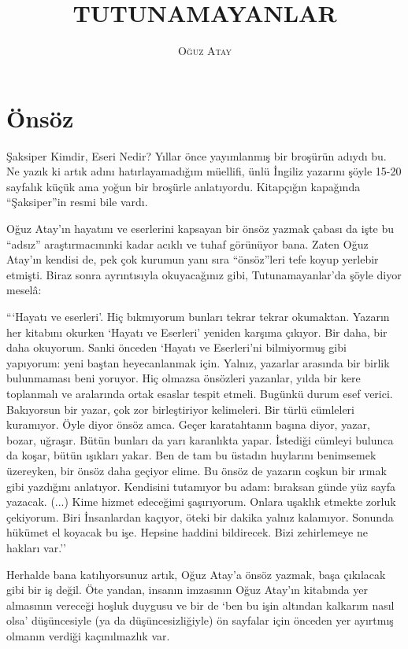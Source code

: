 \documentclass[a5paper,13pt]{scrbook}
\author{\textsc{Oğuz Atay}}
\title{TUTUNAMAYANLAR}
\date{}
\begin{document}
\maketitle

\chapter*{Önsöz}

Şaksiper Kimdir, Eseri Nedir? Yıllar önce yayımlanmış bir broşürün adıydı bu. Ne
yazık ki artık adını hatırlayamadığım müellifi, ünlü İngiliz yazarını şöyle
15-20 sayfalık küçük ama yoğun bir broşürle anlatıyordu. Kitapçığın kapağında
``Şaksiper''in resmi bile vardı.

Oğuz Atay'ın hayatını ve eserlerini kapsayan bir önsöz yazmak çabası da işte bu
``adsız'' araştırmacınınki kadar acıklı ve tuhaf görünüyor bana. Zaten Oğuz
Atay'ın kendisi de, pek çok kurumun yanı sıra ``önsöz''leri tefe koyup yerlebir
etmişti. Biraz sonra ayrıntısıyla okuyacağınız gibi, Tutunamayanlar'da şöyle
diyor meselâ:

```Hayatı ve eserleri'. Hiç bıkmıyorum bunları tekrar tekrar okumaktan. Yazarın
her kitabını okurken `Hayatı ve Eserleri' yeniden karşıma çıkıyor. Bir daha, bir
daha okuyorum. Sanki önceden `Hayatı ve Eserleri'ni bilmiyormuş gibi yapıyorum:
yeni baştan heyecanlanmak için. Yalnız, yazarlar arasında bir birlik bulunmaması
beni yoruyor. Hiç olmazsa önsözleri yazanlar, yılda bir kere toplanmalı ve
aralarında ortak esaslar tespit etmeli. Bugünkü durum esef verici. Bakıyorsun
bir yazar, çok zor birleştiriyor kelimeleri. Bir türlü cümleleri kuramıyor. Öyle
diyor önsöz amca. Geçer karatahtanın başına diyor, yazar, bozar, uğraşır. Bütün
bunları da yarı karanlıkta yapar. İstediği cümleyi bulunca da koşar, bütün
ışıkları yakar. Ben de tam bu üstadın huylarını benimsemek üzereyken, bir önsöz
daha geçiyor elime. Bu önsöz de yazarın coşkun bir ırmak gibi yazdığını
anlatıyor. Kendisini tutamıyor bu adam: bıraksan günde yüz sayfa yazacak. (...)
Kime hizmet edeceğimi şaşırıyorum. Onlara uşaklık etmekte zorluk çekiyorum. Biri
İnsanlardan kaçıyor, öteki bir dakika yalnız kalamıyor. Sonunda hükümet el
koyacak bu işe. Hepsine haddini bildirecek. Bizi zehirlemeye ne hakları var.''

Herhalde bana katılıyorsunuz artık, Oğuz Atay'a önsöz yazmak, başa çıkılacak
gibi bir iş değil. Öte yandan, insanın imzasının Oğuz Atay'ın kitabında yer
almasının vereceği hoşluk duygusu ve bir de `ben bu işin altından kalkarım nasıl
olsa' düşüncesiyle (ya da düşüncesizliğiyle) ön sayfalar için önceden yer
ayırtmış olmanın verdiği kaçınılmazlık var.
\end{document}

